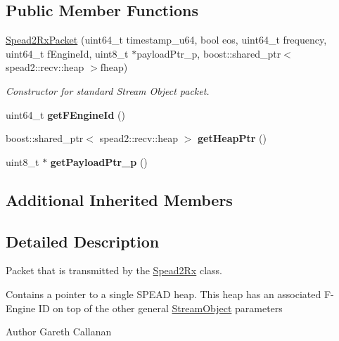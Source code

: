 \subsection*{Public Member Functions}
\begin{DoxyCompactItemize}
\item 
\hyperlink{class_spead2_rx_packet_a3e6c4be507e0e8534577c8b8aaeddb5a}{Spead2\+Rx\+Packet} (uint64\+\_\+t timestamp\+\_\+u64, bool eos, uint64\+\_\+t frequency, uint64\+\_\+t f\+Engine\+Id, uint8\+\_\+t $\ast$payload\+Ptr\+\_\+p, boost\+::shared\+\_\+ptr$<$ spead2\+::recv\+::heap $>$fheap)
\begin{DoxyCompactList}\small\item\em Constructor for standard Stream Object packet. \end{DoxyCompactList}\item 
uint64\+\_\+t {\bfseries get\+F\+Engine\+Id} ()\hypertarget{class_spead2_rx_packet_ad238deecbaa1074c699f556f1f5140df}{}\label{class_spead2_rx_packet_ad238deecbaa1074c699f556f1f5140df}

\item 
boost\+::shared\+\_\+ptr$<$ spead2\+::recv\+::heap $>$ {\bfseries get\+Heap\+Ptr} ()\hypertarget{class_spead2_rx_packet_aa3581f67d7d3f7cd4ce5e7098f7917e3}{}\label{class_spead2_rx_packet_aa3581f67d7d3f7cd4ce5e7098f7917e3}

\item 
uint8\+\_\+t $\ast$ {\bfseries get\+Payload\+Ptr\+\_\+p} ()\hypertarget{class_spead2_rx_packet_a2f1d673b212b4bf908b2cce11a20f996}{}\label{class_spead2_rx_packet_a2f1d673b212b4bf908b2cce11a20f996}

\end{DoxyCompactItemize}
\subsection*{Additional Inherited Members}


\subsection{Detailed Description}
Packet that is transmitted by the \hyperlink{class_spead2_rx}{Spead2\+Rx} class. 

Contains a pointer to a single S\+P\+E\+AD heap. This heap has an associated F-\/\+Engine ID on top of the other general \hyperlink{class_stream_object}{Stream\+Object} parameters

\begin{DoxyAuthor}{Author}
Gareth Callanan 
\end{DoxyAuthor}


